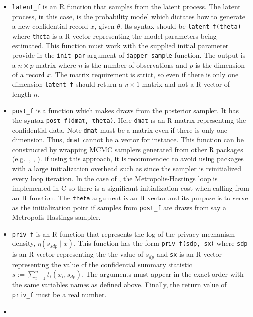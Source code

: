 \begin{itemize}
\item
  \texttt{latent\_f} is an R function that samples from the latent process.
  The latent process, in this case, is the probability model which dictates how
  to generate a new confidential record \(x\), given \(\theta\).
  Its syntax should be \texttt{latent\_f(theta)} where \texttt{theta} is a R vector
  representing the model parameters being estimated. This function
  must work with the supplied initial parameter provide in the \texttt{init\_par}
  argument of \texttt{dapper\_sample} function. The output is a \(n \times p\) matrix
  where \(n\) is the number of observations and \(p\) is the dimension of a record \(x\).
  The matrix requirement is strict, so even if there is only one dimension
  \texttt{latent\_f} should return a \(n \times 1\) matrix and not a R vector of length \(n\).
\item
  \texttt{post\_f} is a function which makes draws from the posterior sampler. It has
  the syntax \texttt{post\_f(dmat,\ theta)}. Here \texttt{dmat} is an R matrix representing the confidential data.
  Note \texttt{dmat} must be a matrix even if there is only one dimension. Thus, \texttt{dmat} cannot
  be a vector for instance. This function can be constructed by wrapping MCMC samplers generated from other R packages
  (e.g.~, , ).
  If using this approach, it is recommended to avoid using packages
  with a large initialization overhead such as  since the sampler is reinitialized
  every loop iteration. In the case of ,
  the Metropolis-Hastings loop is implemented in C so there is a significant initialization cost
  when calling from an R function. The \texttt{theta} argument is an R vector and its purpose is
  to serve as the initialization point if samples from \texttt{post\_f} are draws
  from say a Metropolis-Hastings sampler.
\item
  \texttt{priv\_f} is an R function that represents the log of the privacy mechanism density, \(\eta(s_{sdp} \mid x)\).
  This function has the form \texttt{priv\_f(sdp,\ sx)} where \texttt{sdp} is an R vector representing the
  the value of \(s_{dp}\) and \texttt{sx} is an R vector representing the value of the confidential summary statistic
  \(s := \sum_{i=1}^{n} t_i(x_i, s_{dp})\).
  The arguments must appear in the exact order with the same variables names as defined above.
  Finally, the return value of \texttt{priv\_f} must be a real number.
\item

\end{itemize}
